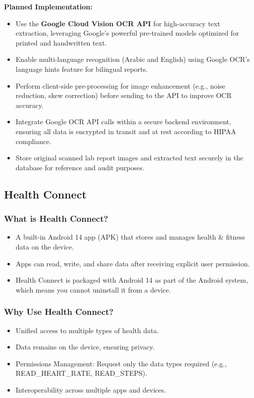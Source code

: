 \documentclass[a4paper, 12pt]{article}
\begin{document}
\textbf{Planned Implementation:}
\begin{itemize}
\item Use the \textbf{Google Cloud Vision OCR API} for high-accuracy text extraction, leveraging Google’s powerful pre-trained models optimized for printed and handwritten text.
\item Enable multi-language recognition (Arabic and English) using Google OCR’s language hints feature for bilingual reports.
\item Perform client-side pre-processing for image enhancement (e.g., noise reduction, skew correction) before sending to the API to improve OCR accuracy.
\item Integrate Google OCR API calls within a secure backend environment, ensuring all data is encrypted in transit and at rest according to HIPAA compliance.
\item Store original scanned lab report images and extracted text securely in the database for reference and audit purposes.
\end{itemize}

\subsection{Health Connect}
\subsubsection{What is Health Connect?}
\begin{itemize}
        \item A built-in Android 14 app (APK) that stores and manages health \& fitness data on the device.
        \item Apps can read, write, and share data after receiving explicit user permission.
        \item Health Connect is packaged with Android 14 as part of the Android system, which means you cannot uninstall it from a device.
\end{itemize}

\subsubsection*{Why Use Health Connect?}
\begin{itemize}
    \item Unified access to multiple types of health data.
    \item Data remains on the device, ensuring privacy.
    \item Permissions Management: Request only the data types required (e.g., READ\_HEART\_RATE, READ\_STEPS).
    \item Interoperability across multiple apps and devices.
\end{itemize}
\end{document}

